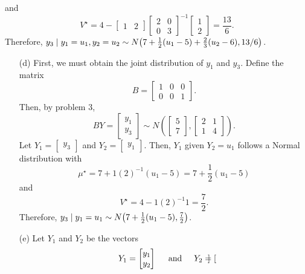 \documentclass[11pt]{article}
\begin{document}
\begin{itemize}
\begin{itemize}
\[\]
and
\[
V^\star = 4 - \begin{bmatrix}
1 & 2
\end{bmatrix} \begin{bmatrix}
2 & 0 \\
0 & 3
\end{bmatrix}^{-1} \begin{bmatrix}
1 \\ 2
\end{bmatrix} = \frac{13}{6}.
\]
Therefore, $y_3 \mid y_1 = u_1, y_2 = u_2 \sim N\big{(}7 + \frac{1}{2}(u_1 - 5) + \frac{2}{3}(u_2 - 6), 13/6\big{)}$.
\end{itemize}
\begin{itemize}
\item[(d)]  First, we must obtain the joint distribution of $y_1$ and $y_3$.  Define the matrix
\[
B = \begin{bmatrix}
1 & 0 & 0 \\
0 & 0 & 1
\end{bmatrix}.
\]
Then, by problem 3, 
\[
BY = \begin{bmatrix}
y_1 \\ y_3
\end{bmatrix} \sim N\left(\begin{bmatrix}
5 \\ 7
\end{bmatrix}, \begin{bmatrix}
2 & 1 \\
1 & 4
\end{bmatrix}\right).
\]
Let $Y_1 = \begin{bmatrix}
y_3
\end{bmatrix}$ and $Y_2 = \begin{bmatrix}
y_1
\end{bmatrix}$.  Then, $Y_1$ given $Y_2 = u_1$ follows a Normal distribution with
\[
\mu^\star = 7 + 1(2)^{-1}(u_1 - 5) = 7 + \frac{1}{2}(u_1 - 5)
\]
and
\[
V^\star = 4 - 1(2)^{-1}1 = \frac{7}{2}.
\]
Therefore, $y_3 \mid y_1 = u_1 \sim N\big{(}7+\frac{1}{2}(u_1 - 5), \frac{7}{2}\big{)}$.
\end{itemize}
\begin{itemize}
\item[(e)]  Let $Y_1$ and $Y_2$ be the vectors
\[
Y_1 = \begin{bmatrix}
y_1 \\ y_2
\end{bmatrix} \hspace{5mm}\text{and}\hspace{5mm} Y_2 = \begin{bmatrix}

\end{bmatrix}\]
\end{itemize}
\end{itemize}
\end{document}
